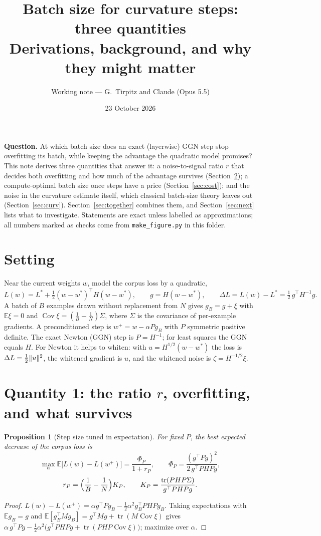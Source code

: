 \documentclass[11pt,a4paper]{article}
\title{Batch size for curvature steps: three quantities\\[0.3em]
\large Derivations, background, and why they might matter}
\author{Working note --- G.~Tirpitz and Claude (Opus 5.5)}
\date{23 October 2026}
\DeclareMathOperator{\tr}{tr}
\DeclarePairedDelimiter{\norm}{\lVert}{\rVert}
\newcommand{\E}{\mathbb{E}}
\theoremstyle{plain}
\newtheorem{proposition}{Proposition}
\theoremstyle{definition}
\theoremstyle{remark}
\begin{document}
\maketitle

\noindent\textbf{Question.} At which batch size does an exact (layerwise) GGN step stop overfitting its batch, while
keeping the advantage the quadratic model promises? This note derives three quantities that answer it: a
noise-to-signal ratio $r$ that decides both overfitting and how much of the advantage survives
(Section~\ref{sec:r}); a compute-optimal batch size once steps have a price (Section~\ref{sec:cost}); and the noise
in the curvature estimate itself, which classical batch-size theory leaves out (Section~\ref{sec:curv}).
Section~\ref{sec:together} combines them, and Section~\ref{sec:next} lists what to investigate. Statements are
exact unless labelled as approximations; all numbers marked as checks come from \texttt{make\_figure.py} in this
folder.

\section{Setting}

Near the current weights $w$, model the corpus loss by a quadratic,
\[
L(w)=L^*+\tfrac12(w-w^*)^\top H(w-w^*),\qquad g=H(w-w^*),\qquad \Delta L=L(w)-L^*=\tfrac12\,g^\top H^{-1}g .
\]
A batch of $B$ examples drawn without replacement from $N$ gives $g_B=g+\xi$ with $\E\xi=0$ and
$\operatorname{Cov}\xi=(\tfrac1B-\tfrac1N)\Sigma$, where $\Sigma$ is the covariance of per-example gradients. A
preconditioned step is $w^+=w-\alpha Pg_B$ with $P$ symmetric positive definite. The exact Newton (GGN) step is
$P=H^{-1}$; for least squares the GGN equals $H$. For Newton it helps to whiten: with $u=H^{1/2}(w-w^*)$ the loss is
$\Delta L=\frac12\norm{u}^2$, the whitened gradient is $u$, and the whitened noise is $\zeta=H^{-1/2}\xi$.

\section{Quantity 1: the ratio $r$, overfitting, and what survives}\label{sec:r}

\begin{proposition}[Step size tuned in expectation]\label{prop:tuned}
For fixed $P$, the best expected decrease of the corpus loss is
\[
\max_\alpha \E\bigl[L(w)-L(w^+)\bigr]=\frac{\Phi_P}{1+r_P},\qquad
\Phi_P=\frac{(g^\top Pg)^2}{2\,g^\top PHPg},
\]
\[
r_P=\Bigl(\frac1B-\frac1N\Bigr)K_P,\qquad
K_P=\frac{\tr(PHP\Sigma)}{g^\top PHPg}.
\]
\end{proposition}
\begin{proof}
$L(w)-L(w^+)=\alpha g^\top Pg_B-\frac12\alpha^2 g_B^\top PHPg_B$. Taking expectations with $\E g_B=g$ and
$\E[g_B^\top Mg_B]=g^\top Mg+\tr(M\operatorname{Cov}\xi)$ gives
$\alpha\,g^\top Pg-\frac12\alpha^2\bigl(g^\top PHPg+\tr(PHP\operatorname{Cov}\xi)\bigr)$; maximize over $\alpha$.
\end{proof}
\end{document}
